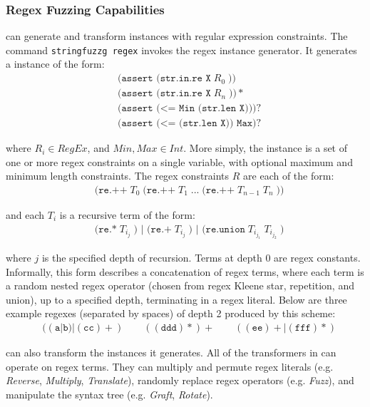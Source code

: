 \subsubsection{Regex Fuzzing Capabilities}

\fuzzer{} can generate
and transform instances with regular expression constraints. The
command \texttt{stringfuzzg regex} invokes the regex instance
generator. It generates a instance of the form:
\begin{align*}
    & \texttt{(assert (str.in.re X}\; R_0\; \texttt{))} \\
    & \texttt{(assert (str.in.re X}\; R_n\; \texttt{))}* \\
    & \texttt{(assert (<= Min (str.len X)))}? \\
    & \texttt{(assert (<= (str.len X)) Max)}?
\end{align*}

where $R_i \in RegEx$, and $Min, Max \in Int$. More simply, the
instance is a set of one or more regex constraints on a single
variable, with optional maximum and minimum length constraints. The
regex constraints $R$ are each of the form:
\begin{align*}
  & \texttt{(re.++}\; T_0\; \texttt{(re.++}\; T_1\;
  \texttt{...}\; \texttt{(re.++}\; T_{n-1}\; T_n\; \texttt{))}
\end{align*}

and each $T_i$ is a recursive term of the form:
\begin{align*}
  & \texttt{(re.*}\; T_{i_j}\; \texttt{) | (re.+}\; T_{i_j}\;
  \texttt{) | (re.union}\; T_{i_{j_1}}\; T_{i_{j_2}}\; \texttt{)}
\end{align*}

where $j$ is the specified depth of recursion. Terms at depth 0 are
regex constants. Informally, this form describes a concatenation of
regex terms, where each term is a random nested regex operator (chosen from
regex Kleene star, repetition, and union), up to a specified depth,
terminating in a regex literal. Below are three example regexes
(separated by spaces) of depth 2 produced by this scheme:
\begin{align*}
  & ((\texttt{a}|\texttt{b})|(\texttt{cc})+)\quad\quad
  ((\texttt{ddd})*)+\quad\quad ((\texttt{ee})+|(\texttt{fff})*)
\end{align*}

\fuzzer{} can also transform the instances it generates. All of the
transformers in \transformer{} can operate on regex terms. They can
multiply and permute regex literals (e.g. \textit{Reverse},
\textit{Multiply}, \textit{Translate}), randomly replace regex
operators (e.g. \textit{Fuzz}), and manipulate the syntax tree
(e.g. \textit{Graft}, \textit{Rotate}).


